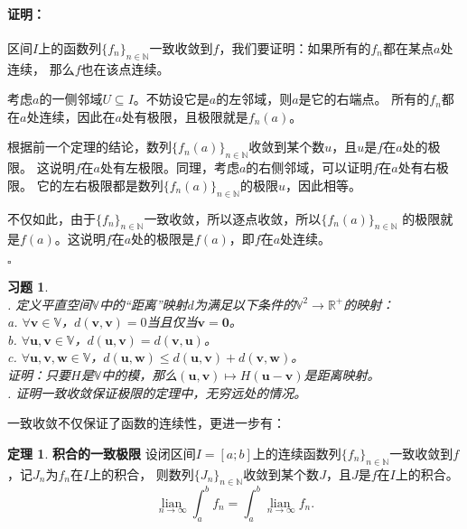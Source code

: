 \documentclass[12pt,UTF8]{ctexbook}
\newcommand{\lian}[1]{
    \underset{#1}{\operatorname{lian}\,}
}
\theoremstyle{definition}
\newtheorem{tm}{定理}[section]
\theoremstyle{plain}
\newtheorem{xt}{习题}[section]
\renewenvironment{proof}{\paragraph{\textbf{证明：}}}{\hfill$\square$}
\begin{document}
\begin{appendix}
\begin{proof}
    区间$I$上的函数列$\{f_n\}_{n\in\mathbb{N}}$一致收敛到$f$，我们要证明：如果所有的$f_n$都在某点$a$处连续，
    那么$f$也在该点连续。

    考虑$a$的一侧邻域$U\subseteq I$。不妨设它是$a$的左邻域，则$a$是它的右端点。
    所有的$f_n$都在$a$处连续，因此在$a$处有极限，且极限就是$f_n(a)$。

    根据前一个定理的结论，数列$\{f_n(a)\}_{n\in\mathbb{N}}$收敛到某个数$u$，且$u$是$f$在$a$处的极限。
    这说明$f$在$a$处有左极限。同理，考虑$a$的右侧邻域，可以证明$f$在$a$处有右极限。
    它的左右极限都是数列$\{f_n(a)\}_{n\in\mathbb{N}}$的极限$u$，因此相等。
    
    不仅如此，由于$\{f_n\}_{n\in\mathbb{N}}$一致收敛，所以逐点收敛，所以$\{f_n(a)\}_{n\in\mathbb{N}}$
    的极限就是$f(a)$。这说明$f$在$a$处的极限是$f(a)$，即$f$在$a$处连续。

\end{proof}

\begin{xt}
    \mbox{} \\
    . 定义平直空间$\mathbb{V}$中的“距离”映射$d$为满足以下条件的$\mathbb{V}^2 \rightarrow \mathbb{R}^+$的映射：\\
    \indent \indent a. $\forall \mathbf{v} \in \mathbb{V}$，$d(\mathbf{v}, \mathbf{v}) = 0$当且仅当$\mathbf{v} = \mathbf{0}$。\\
    \indent \indent b. $\forall \mathbf{u}, \mathbf{v} \in \mathbb{V}$，$d(\mathbf{u}, \mathbf{v}) = d(\mathbf{v}, \mathbf{u})$。\\
    \indent \indent c. $\forall \mathbf{u}, \mathbf{v}, \mathbf{w} \in \mathbb{V}$，$d(\mathbf{u}, \mathbf{w}) \leqslant d(\mathbf{u}, \mathbf{v}) + d(\mathbf{v}, \mathbf{w})$。\\
    \indent 证明：只要$H$是$\mathbb{V}$中的模，那么$(\mathbf{u}, \mathbf{v})\mapsto H(\mathbf{u} - \mathbf{v})$是距离映射。\\
    . 证明一致收敛保证极限的定理中，无穷远处的情况。
\end{xt}

一致收敛不仅保证了函数的连续性，更进一步有：

\begin{tm}{\textbf{积合的一致极限}}
    设闭区间$I=[a;b]$上的连续函数列$\{f_n\}_{n\in\mathbb{N}}$一致收敛到$f$，记$J_n$为$f_n$在$I$上的积合，
    则数列$\{J_n\}_{n\in\mathbb{N}}$收敛到某个数$J$，且$J$是$f$在$I$上的积合。
    $$ \lian{n\to \infty} \int_a^b f_n = \int_a^b \lian{n\to\infty} f_n. $$
\end{tm}


\end{appendix}
\end{document}
